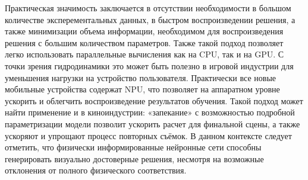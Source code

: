 Практическая значимость заключается в отсутствии необходимости в большом количестве
эксперементальных данных, в быстром воспроизведении решения, а также минимизации
объема информации, необходимом для воспроизведения решения с большим количеством
параметров. Также такой подход позволяет легко использовать параллельные вычисления
как на CPU, так и на GPU. С точки зрения гидродинамики это может быть полезно в игровой индустрии
для уменьшения нагрузки на устройство пользователя. Практически все новые мобильные
устройства содержат NPU, что позволяет на аппаратном уровне ускорить и облегчить
воспроизведение результатов обучения. Такой подход может найти применение и в 
киноиндустрии: «запекание» с возможностью подробной параметризации модели позволит
ускорить расчет для финальной сцены, а также ускоряют и упрощают процесс повторных съёмок.
В данном контексте следует отметить, что физически информированные нейронные сети способны
генерировать визуально достоверные решения, несмотря на возможные отклонения от полного
физического соответствия.
